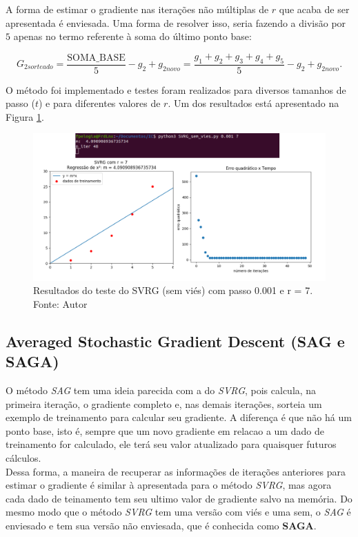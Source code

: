 \documentclass[a4paper,12pt]{article}
\begin{document}
A forma de estimar o gradiente nas iterações não múltiplas de $r$ que acaba de ser apresentada é enviesada. Uma forma de resolver isso, seria fazendo a divisão por $5$ apenas no termo referente à soma do último ponto base:

$$G_{2sorteado} = \frac{\text{SOMA\_BASE} }{5} - g_2 + g_{2novo}  = \frac{g_1 + g_2 + g_3 + g_4 + g_5}{5} - g_2 + g_{2novo}.$$


O método foi implementado e testes foram realizados para diversos tamanhos de passo ($t$) e para diferentes valores de $r$. Um dos resultados está apresentado na Figura \ref{fig:SVRG}.


\begin{figure}[H]
\centering 
\includegraphics[scale=0.5]{Figuras/SVRG.png}
\caption{Resultados do teste do SVRG (sem viés) com passo 0.001 e r = 7. Fonte: Autor}
\label{fig:SVRG}
\end{figure} 

\subsection{Averaged Stochastic Gradient Descent (SAG e SAGA)}

O método \textit{SAG} tem uma ideia parecida com a do \textit{SVRG}, pois calcula, na primeira iteração, o gradiente completo e, nas demais iterações, sorteia um exemplo de treinamento para calcular seu gradiente. A diferença é que não há um ponto base, isto é, sempre que um novo gradiente em relacao a um dado de treinamento for calculado, ele terá seu valor atualizado para quaisquer futuros cálculos.\\

Dessa forma, a maneira de recuperar as informações de iterações anteriores para estimar o gradiente é similar à apresentada para o método \textit{SVRG}, mas agora cada dado de teinamento tem seu ultimo valor de gradiente salvo na memória. Do mesmo modo que o método \textit{SVRG} tem uma versão com viés e uma sem, o \textit{SAG} é enviesado e tem sua versão não enviesada, que é conhecida como \textbf{SAGA}.
\end{document}
